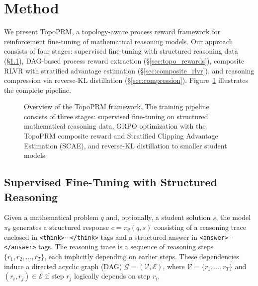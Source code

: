 \section{Method}
\label{sec:method}

We present TopoPRM, a topology-aware process reward framework for
reinforcement fine-tuning of mathematical reasoning models.
Our approach consists of four stages: supervised fine-tuning with
structured reasoning data (\S\ref{sec:sft}), DAG-based process reward
extraction (\S\ref{sec:topo_rewards}), composite RLVR with stratified
advantage estimation (\S\ref{sec:composite_rlvr}), and reasoning
compression via reverse-KL distillation (\S\ref{sec:compression}).
Figure~\ref{fig:overview} illustrates the complete pipeline.

\begin{figure}[t]
    \centering
    \caption{Overview of the TopoPRM framework. The training pipeline
    consists of three stages: supervised fine-tuning on structured
    mathematical reasoning data, GRPO optimization with the TopoPRM
    composite reward and Stratified Clipping Advantage Estimation (SCAE),
    and reverse-KL distillation to smaller student models.}
    \label{fig:overview}
\end{figure}

\subsection{Supervised Fine-Tuning with Structured Reasoning}
\label{sec:sft}

Given a mathematical problem $q$ and, optionally, a student solution $s$,
the model $\pi_\theta$ generates a structured response
$c = \pi_\theta(q, s)$ consisting of a reasoning trace enclosed in
\texttt{<think>$\cdots$</think>} tags and a structured answer in
\texttt{<answer>$\cdots$</answer>} tags. The reasoning trace is a sequence
of reasoning steps $\{r_1, r_2, \ldots, r_T\}$, each implicitly depending
on earlier steps. These dependencies induce a directed acyclic graph (DAG)
$\mathcal{G} = (\mathcal{V}, \mathcal{E})$, where $\mathcal{V} = \{r_1,
\ldots, r_T\}$ and $(r_i, r_j) \in \mathcal{E}$ if step $r_j$ logically
depends on step $r_i$.

